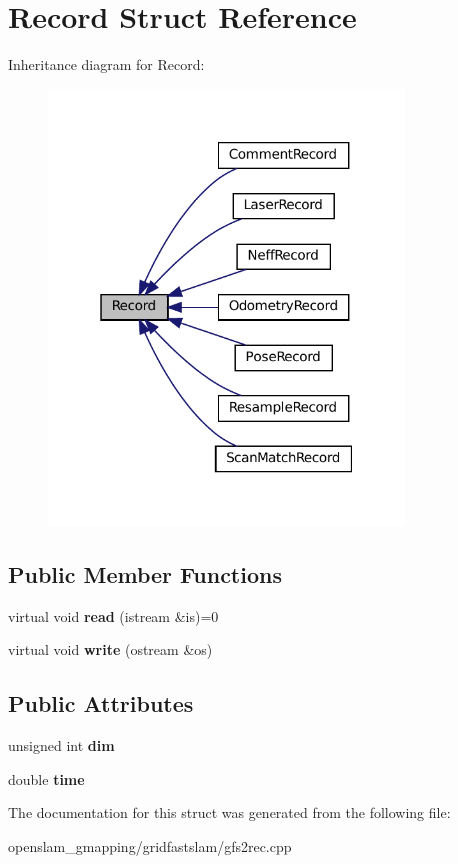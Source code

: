 \hypertarget{structRecord}{}\section{Record Struct Reference}
\label{structRecord}


Inheritance diagram for Record\+:
\nopagebreak
\begin{figure}[H]
\begin{center}
\leavevmode
\includegraphics[width=268pt]{structRecord__inherit__graph}
\end{center}
\end{figure}
\subsection*{Public Member Functions}
\begin{DoxyCompactItemize}
\item 
\mbox{\label{structRecord_a406fd539998d83843bedf20dd794bc8d}} 
virtual void {\bfseries read} (istream \&is)=0
\item 
\mbox{\label{structRecord_affb40bd18fbe5e693e5d0a9557af0170}} 
virtual void {\bfseries write} (ostream \&os)
\end{DoxyCompactItemize}
\subsection*{Public Attributes}
\begin{DoxyCompactItemize}
\item 
\mbox{\label{structRecord_a741129438ce128174caeddfa6fc11360}} 
unsigned int {\bfseries dim}
\item 
\mbox{\label{structRecord_ab2cd772df817afdb56bdbefbe90e9cb9}} 
double {\bfseries time}
\end{DoxyCompactItemize}


The documentation for this struct was generated from the following file\+:\begin{DoxyCompactItemize}
\item 
openslam\+\_\+gmapping/gridfastslam/gfs2rec.\+cpp\end{DoxyCompactItemize}
